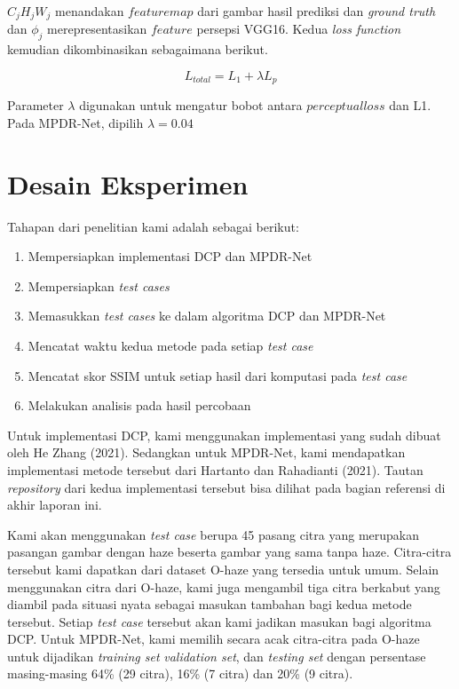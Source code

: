 \documentclass[11pt, a4paper, final]{report}
\begin{document}
\begin{enumerate}
    $C_jH_jW_j$ menandakan $feature map$ dari gambar hasil prediksi dan \textit{ground truth} dan $\phi_j$ merepresentasikan $feature$ persepsi VGG16. Kedua \textit{loss function} kemudian dikombinasikan sebagaimana berikut.
    
    \begin{equation} \label{eq28}
    L_{total}=L_1+\lambda{L_p}
    \end{equation}
    
    Parameter $\lambda$ digunakan untuk mengatur bobot antara $perceptual loss$ dan L1. Pada MPDR-Net, dipilih $\lambda = 0.04$
    
\end{enumerate}



\section{Desain Eksperimen}

Tahapan dari penelitian kami adalah sebagai berikut:
\begin{enumerate}
  \item Mempersiapkan implementasi DCP dan MPDR-Net
  \item Mempersiapkan \textit{test cases}
  \item Memasukkan \textit{test cases} ke dalam algoritma DCP dan MPDR-Net
  \item Mencatat waktu kedua metode pada setiap \textit{test case}
  \item Mencatat skor SSIM untuk setiap hasil dari komputasi pada \textit{test case}
  \item Melakukan analisis pada hasil percobaan
\end{enumerate}

Untuk implementasi DCP, kami menggunakan implementasi yang sudah dibuat oleh He Zhang (2021). Sedangkan untuk MPDR-Net, kami mendapatkan implementasi metode tersebut dari Hartanto dan Rahadianti (2021). Tautan \textit{repository} dari kedua implementasi tersebut bisa dilihat pada bagian referensi di akhir laporan ini.

Kami akan menggunakan \textit{test case} berupa 45 pasang citra yang merupakan pasangan gambar dengan haze beserta gambar yang sama tanpa haze. Citra-citra tersebut kami dapatkan dari dataset O-haze yang tersedia untuk umum. Selain menggunakan citra dari O-haze, kami juga mengambil tiga citra berkabut yang diambil pada situasi nyata sebagai masukan tambahan bagi kedua metode tersebut. Setiap \textit{test case} tersebut akan kami jadikan masukan bagi algoritma DCP. Untuk MPDR-Net, kami memilih secara acak citra-citra pada O-haze untuk dijadikan \textit{training set} \textit{validation set},  dan \textit{testing set} dengan persentase masing-masing 64\% (29 citra), 16\% (7 citra) dan 20\% (9 citra).
\end{document}
